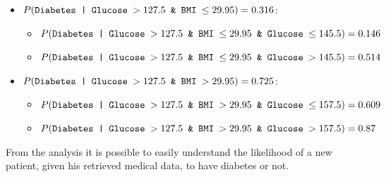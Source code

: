 \documentclass[12pt]{article}
\begin{document}
\begin{enumerate}[leftmargin=\labelsep, label=\textbf{\arabic*.)}]
\begin{enumerate}[label=\textbf{\roman*.)}]
\begin{itemize}
\begin{itemize}
                                  \item $P( \text{\texttt{Diabetes | Glucose $> 127.5$ \& BMI $\leq 29.95$}}) = 0.316$:
                                        \begin{itemize}
                                            \item $P( \text{\texttt{Diabetes | Glucose $> 127.5$ \& BMI $\leq 29.95$ \& Glucose $\leq 145.5$}}) = 0.146$
                                            \item $P( \text{\texttt{Diabetes | Glucose $> 127.5$ \& BMI $\leq 29.95$ \& Glucose $> 145.5$}}) = 0.514$
                                        \end{itemize}
                                  \item $P( \text{\texttt{Diabetes | Glucose $> 127.5$ \& BMI $> 29.95$}}) = 0.725$:
                                        \begin{itemize}
                                            \item $P( \text{\texttt{Diabetes | Glucose $> 127.5$ \& BMI $> 29.95$ \& Glucose $\leq 157.5$}}) = 0.609$
                                            \item $P( \text{\texttt{Diabetes | Glucose $> 127.5$ \& BMI $> 29.95$ \& Glucose $> 157.5$}}) = 0.87$
                                        \end{itemize}
                              \end{itemize}
                    \end{itemize}
                    \vspace{0.5em}
                    From the analysis it is possible to easily understand the likelihood of a new patient, given his retrieved medical data, to have diabetes or not.
          \end{enumerate}
\end{enumerate}
\end{document}
